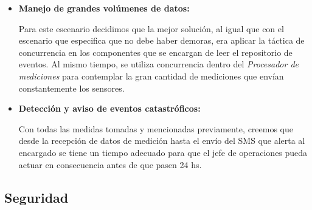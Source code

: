 \begin{itemize}
    \item \textbf{Manejo de grandes volúmenes de datos:}
    \par Para este escenario decidimos que la mejor solución, al igual que con el escenario que especifica que no debe haber demoras, era aplicar la táctica de concurrencia en los componentes que se encargan de leer el repositorio de eventos. Al mismo tiempo, se utiliza concurrencia dentro del \textit{Procesador de mediciones} para contemplar la gran cantidad de mediciones que envían constantemente los sensores.
    
    \item \textbf{Detección y aviso de eventos catastróficos:}
    \par Con todas las medidas tomadas y mencionadas previamente, creemos que desde la recepción de datos de medición hasta el envío del SMS que alerta al encargado se tiene un tiempo adecuado para que el jefe de operaciones pueda actuar en consecuencia antes de que pasen 24 hs.

\end{itemize}

\subsection{Seguridad}

